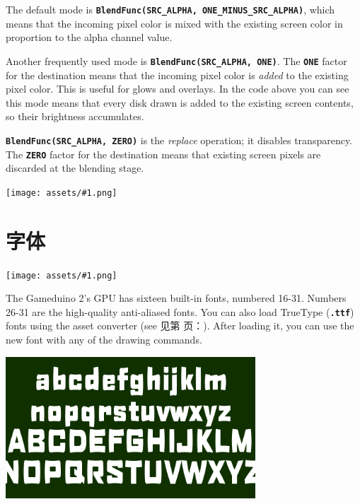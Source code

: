 \documentclass[10pt]{book}
\newcommand{\gdtwos}{Gameduino 2's }
\newcommand{\png}[1]{
\begin{center}
\texttt{[image: assets/\#1.png]}
\end{center}
}
\newcommand{\mach}[1]{\texttt{\textbf{#1}}}
\newcommand{\xref}[1]{见第 \pageref{#1} 页：\textit{\nameref{#1}}}
\newcommand{\term}[1]{\emph{#1}\index{#1}}
\begin{document}
\begin{CJK}{UTF8}{gkai}
\begin{center}
\end{center}

The default mode is
\mach{BlendFunc(SRC\_ALPHA, ONE\_MINUS\_SRC\_ALPHA)}, which means that the incoming pixel color
is mixed with the existing screen color in proportion to the alpha channel value.

Another frequently used mode is
\mach{BlendFunc(SRC\_ALPHA, ONE)}. The \mach{ONE} factor for the destination means that the
incoming pixel color is \textit{added}
to the existing pixel color.
This is useful for glows and overlays.
In the code above you can see this mode means that every disk drawn is added to the existing screen contents,
so their brightness accumulates.

\mach{BlendFunc(SRC\_ALPHA, ZERO)} is the \term{replace} operation; it disables transparency.
The \mach{ZERO} factor for the destination means that existing screen pixels are discarded at the blending stage.

\png{0069}

\newpage
\section{字体}
\png{fonts0}

The \gdtwos GPU has sixteen built-in fonts, numbered 16-31.
Numbers 26-31 are the high-quality anti-aliased fonts.
You can also load TrueType (\mach{.ttf}) fonts
using the asset converter (see \xref{assets}).
After loading it, you can use the new font with any of the drawing commands.


\begin{center}
\includegraphics[width=0.7\textwidth]{assets/fonts1.png}
\end{center}


\end{CJK}
\end{document}
